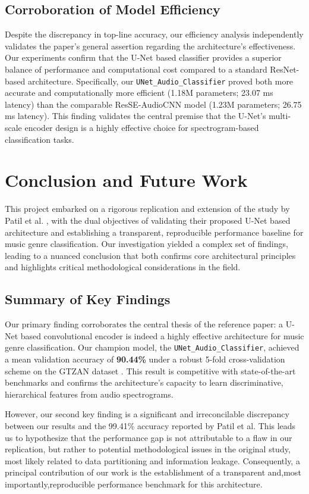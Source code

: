 \documentclass[11pt,a4paper]{article}
\begin{document}
\subsection{Corroboration of Model Efficiency}
Despite the discrepancy in top-line accuracy, our efficiency analysis independently validates the paper's general assertion regarding the architecture's effectiveness. Our experiments confirm that the U-Net based classifier provides a superior balance of performance and computational cost compared to a standard ResNet-based architecture. Specifically, our \texttt{UNet\_Audio\_Classifier} proved both more accurate and computationally more efficient (1.18M parameters; 23.07 ms latency) than the comparable ResSE-AudioCNN model (1.23M parameters; 26.75 ms latency). This finding validates the central premise that the U-Net's multi-scale encoder design is a highly effective choice for spectrogram-based classification tasks.


\section{Conclusion and Future Work}
\label{sec:conclusion}

This project embarked on a rigorous replication and extension of the study by Patil et al. \cite{patil}, with the dual objectives of validating their proposed U-Net based architecture and establishing a transparent, reproducible performance baseline for music genre classification. Our investigation yielded a complex set of findings, leading to a nuanced conclusion that both confirms core architectural principles and highlights critical methodological considerations in the field.

\subsection{Summary of Key Findings}
Our primary finding corroborates the central thesis of the reference paper: a U-Net based convolutional encoder is indeed a highly effective architecture for music genre classification. Our champion model, the \texttt{UNet\_Audio\_Classifier}, achieved a mean validation accuracy of \textbf{90.44\%} under a robust 5-fold cross-validation scheme on the GTZAN dataset \textbf{\cite{tzanetakis2002gtzan}}. This result is competitive with state-of-the-art benchmarks and confirms the architecture's capacity to learn discriminative, hierarchical features from audio spectrograms.

However, our second key finding is a significant and irreconcilable discrepancy between our results and the 99.41\% accuracy reported by Patil et al. This leads us to hypothesize that the performance gap is not attributable to a flaw in our replication, but rather to potential methodological issues in the original study, most likely related to data partitioning and information leakage.
Consequently, a principal contribution of our work is the establishment of a transparent and,most importantly,reproducible performance benchmark for this architecture.
\end{document}
